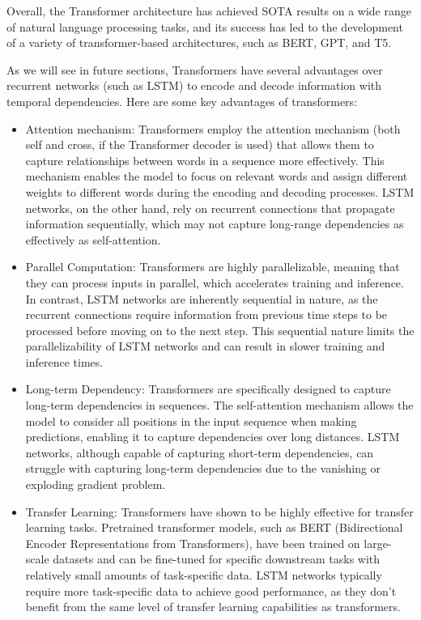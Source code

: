 Overall, the Transformer architecture has achieved \ac{SOTA} results on a wide range of natural language processing tasks, and its success has led to the development of a variety of transformer-based architectures, such as BERT, GPT, and T5.

As we will see in future sections, Transformers have several advantages over recurrent networks (such as \ac{LSTM}) to encode and decode information with temporal dependencies. Here are some key advantages of transformers:

\begin{itemize}
	\item Attention mechanism: Transformers employ the attention mechanism (both self and cross, if the Transformer decoder is used) that allows them to capture relationships between words in a sequence more effectively. This mechanism enables the model to focus on relevant words and assign different weights to different words during the encoding and decoding processes. \ac{LSTM} networks, on the other hand, rely on recurrent connections that propagate information sequentially, which may not capture long-range dependencies as effectively as self-attention.
	
	\item Parallel Computation: Transformers are highly parallelizable, meaning that they can process inputs in parallel, which accelerates training and inference. In contrast, \ac{LSTM} networks are inherently sequential in nature, as the recurrent connections require information from previous time steps to be processed before moving on to the next step. This sequential nature limits the parallelizability of LSTM networks and can result in slower training and inference times.
	
	\item Long-term Dependency: Transformers are specifically designed to capture long-term dependencies in sequences. The self-attention mechanism allows the model to consider all positions in the input sequence when making predictions, enabling it to capture dependencies over long distances. LSTM networks, although capable of capturing short-term dependencies, can struggle with capturing long-term dependencies due to the vanishing or exploding gradient problem.
	
	\item Transfer Learning: Transformers have shown to be highly effective for transfer learning tasks. Pretrained transformer models, such as BERT (Bidirectional Encoder Representations from Transformers), have been trained on large-scale datasets and can be fine-tuned for specific downstream tasks with relatively small amounts of task-specific data. \ac{LSTM} networks typically require more task-specific data to achieve good performance, as they don't benefit from the same level of transfer learning capabilities as transformers.
	

\end{itemize}
